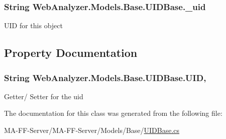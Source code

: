 \subsubsection[{\+\_\+uid}]{\setlength{\rightskip}{0pt plus 5cm}String Web\+Analyzer.\+Models.\+Base.\+U\+I\+D\+Base.\+\_\+uid\hspace{0.3cm}{\ttfamily [private]}}\label{class_web_analyzer_1_1_models_1_1_base_1_1_u_i_d_base_a9b64f6c1cf9fd460888fed19048b9224}


U\+I\+D for this object 



\subsection{Property Documentation}
\hypertarget{class_web_analyzer_1_1_models_1_1_base_1_1_u_i_d_base_a4ed4a066c028bebd3eb39175965c7d81}{}
\subsubsection[{U\+I\+D}]{\setlength{\rightskip}{0pt plus 5cm}String Web\+Analyzer.\+Models.\+Base.\+U\+I\+D\+Base.\+U\+I\+D\hspace{0.3cm}{\ttfamily [get]}, {\ttfamily [set]}}\label{class_web_analyzer_1_1_models_1_1_base_1_1_u_i_d_base_a4ed4a066c028bebd3eb39175965c7d81}


Getter/ Setter for the uid 



The documentation for this class was generated from the following file\+:\begin{DoxyCompactItemize}
\item 
M\+A-\/\+F\+F-\/\+Server/\+M\+A-\/\+F\+F-\/\+Server/\+Models/\+Base/\hyperlink{_u_i_d_base_8cs}{U\+I\+D\+Base.\+cs}\end{DoxyCompactItemize}
